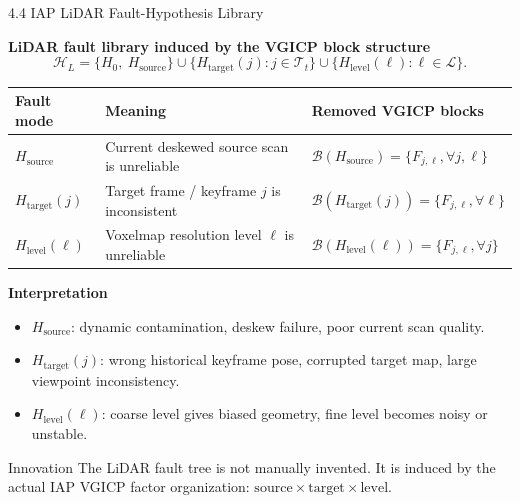 \documentclass[10pt,aspectratio=169,xcolor=dvipsnames]{beamer}
\newcommand{\1}{\mathbb{1}}
\begin{document}
\begin{frame}{4.4 IAP LiDAR Fault-Hypothesis Library}
  \scriptsize

  \textbf{LiDAR fault library induced by the VGICP block structure}
  \[
    \mathcal{H}_L
    =
    \{H_0,\ H_{\mathrm{source}}\}
    \cup
    \{H_{\mathrm{target}}(j):j\in\mathcal{T}_t\}
    \cup
    \{H_{\mathrm{level}}(\ell):\ell\in\mathcal{L}\}.
  \]

  \vspace{2pt}
  \begin{table}
    \scriptsize
    \begin{tabular}{p{} p{} p{}}
      \toprule
      \textbf{Fault mode} & \textbf{Meaning} & \textbf{Removed VGICP blocks}\\
      \midrule
      \(H_{\mathrm{source}}\)
      & Current deskewed source scan is unreliable
      & \(\mathcal{B}(H_{\mathrm{source}})=\{F_{j,\ell},\forall j,\ell\}\)\\
      \addlinespace
      \(H_{\mathrm{target}}(j)\)
      & Target frame / keyframe \(j\) is inconsistent
      & \(\mathcal{B}(H_{\mathrm{target}}(j))=\{F_{j,\ell},\forall \ell\}\)\\
      \addlinespace
      \(H_{\mathrm{level}}(\ell)\)
      & Voxelmap resolution level \(\ell\) is unreliable
      & \(\mathcal{B}(H_{\mathrm{level}}(\ell))=\{F_{j,\ell},\forall j\}\)\\
      \bottomrule
    \end{tabular}
  \end{table}

  \vspace{3pt}
  \textbf{Interpretation}
  \begin{itemize}\scriptsize
    \item \(H_{\mathrm{source}}\): dynamic contamination, deskew failure, poor current scan quality.
    \item \(H_{\mathrm{target}}(j)\): wrong historical keyframe pose, corrupted target map, large viewpoint inconsistency.
    \item \(H_{\mathrm{level}}(\ell)\): coarse level gives biased geometry, fine level becomes noisy or unstable.
  \end{itemize}

  \begin{alertblock}{\small Innovation}
    \scriptsize
    The LiDAR fault tree is not manually invented. It is induced by the actual
    IAP VGICP factor organization: \(\mathrm{source}\times\mathrm{target}\times\mathrm{level}\).
  \end{alertblock}
\end{frame}
\end{document}
